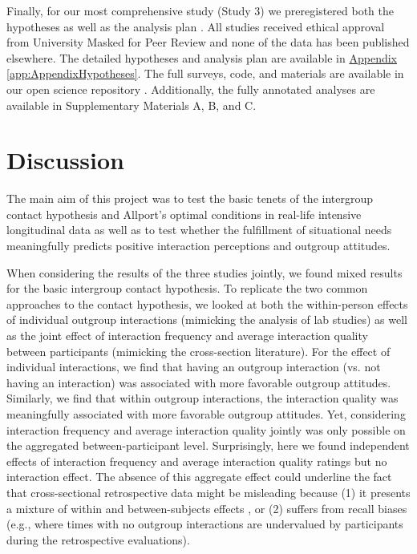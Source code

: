 \documentclass[man, 12pt, a4paper, mask]{apa7}
\theoremstyle{break}
\theoremstyle{plain}
\newcommand{\appref}[2][]{\hyperref[#2]{Appendix \ref*{#2}#1}}
\begin{document}
Finally, for our most comprehensive study (Study 3) we preregistered both the hypotheses as well as the analysis plan \citep[available at][]{KreienkampMasked2021f}. All studies received ethical approval from University Masked for Peer Review and none of the data has been published elsewhere. The detailed hypotheses and analysis plan are available in \appref{app:AppendixHypotheses}. The full surveys, code, and materials are available in our open science repository \citep[including a complete codebook;][]{KreienkampMasked2022a}. Additionally, the fully annotated analyses are available in Supplementary Materials A, B, and C.



\section{Discussion}
The main aim of this project was to test the basic tenets of the intergroup contact hypothesis and Allport's optimal conditions in real-life intensive longitudinal data as well as to test whether the fulfillment of situational needs meaningfully predicts positive interaction perceptions and outgroup attitudes. 

When considering the results of the three studies jointly, we found mixed results for the basic intergroup contact hypothesis. To replicate the two common approaches to the contact hypothesis, we looked at both the within-person effects of individual outgroup interactions (mimicking the analysis of lab studies) as well as the joint effect of interaction frequency and average interaction quality between participants (mimicking the cross-section literature). For the effect of individual interactions, we find that having an outgroup interaction (vs. not having an interaction) was associated with more favorable outgroup attitudes. Similarly, we find that within outgroup interactions, the interaction quality was meaningfully associated with more favorable outgroup attitudes. Yet, considering interaction frequency and average interaction quality jointly was only possible on the aggregated between-participant level. Surprisingly, here we found independent effects of interaction frequency and average interaction quality ratings but no interaction effect. The absence of this aggregate effect could underline the fact that cross-sectional retrospective data might be misleading because (1) it presents a mixture of within and between-subjects effects \citep[][]{Hamaker2020}, or (2) suffers from recall biases (e.g., where times with no outgroup interactions are undervalued by participants during the retrospective evaluations). 
\end{document}
